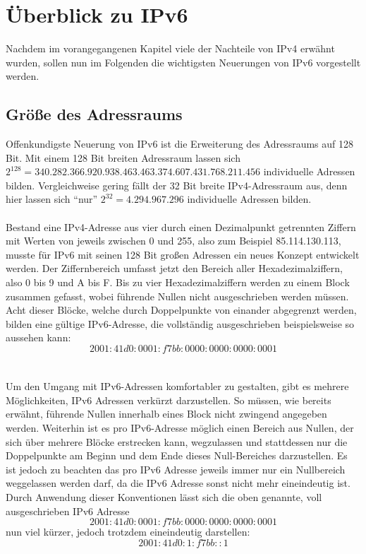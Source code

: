 \documentclass[a4paper,12pt]{scrartcl}
\begin{document}
\clearpage
\section{\"Uberblick zu IPv6}
Nachdem im vorangegangenen Kapitel viele der Nachteile von IPv4 erwähnt wurden, sollen nun im Folgenden die wichtigsten Neuerungen von IPv6 vorgestellt werden. 

\subsection{Gr\"o{\ss}e  des Adressraums}

Offenkundigste Neuerung von IPv6 ist die Erweiterung des Adressraums auf 128 Bit. Mit einem 128 Bit breiten Adressraum lassen sich \\
$2^{128} = 340.282.366.920.938.463.463.374.607.431.768.211.456$ individuelle Adressen bilden. Vergleichweise gering fällt der 32 Bit breite IPv4-Adressraum aus, denn hier lassen sich "`nur"' $2^{32} = 4.294.967.296$ individuelle Adressen bilden. \\
\\
Bestand eine IPv4-Adresse aus vier durch einen Dezimalpunkt getrennten Ziffern mit Werten von jeweils zwischen 0 und 255, also zum Beispiel 85.114.130.113, musste für IPv6 mit seinen 128 Bit großen Adressen ein neues Konzept entwickelt werden.
Der Ziffernbereich umfasst jetzt den Bereich aller Hexadezimalziffern, also 0 bis 9 und A bis F. Bis zu vier Hexadezimalziffern werden zu einem Block zusammen gefasst, wobei führende Nullen nicht ausgeschrieben werden m\"ussen. Acht dieser Blöcke, welche durch Doppelpunkte von einander abgegrenzt werden, bilden eine gültige IPv6-Adresse, die vollständig ausgeschrieben  beispielsweise so aussehen kann:  \[ 2001:41d0:0001:f7bb:0000:0000:0000:0001 \]\\
\\
Um den Umgang mit IPv6-Adressen komfortabler zu gestalten, gibt es mehrere Möglichkeiten, IPv6 Adressen verkürzt darzustellen. So müssen, wie bereits erwähnt, führende Nullen innerhalb eines Block nicht zwingend angegeben werden. Weiterhin ist es pro IPv6-Adresse möglich einen Bereich aus Nullen, der sich über mehrere Blöcke erstrecken kann, wegzulassen und stattdessen nur die Doppelpunkte am Beginn und dem Ende dieses Null-Bereiches darzustellen. Es ist jedoch zu beachten das pro IPv6 Adresse jeweils immer nur ein Nullbereich weggelassen werden darf, da die IPv6 Adresse sonst nicht mehr eineindeutig ist. Durch Anwendung dieser Konventionen lässt sich die oben genannte, voll ausgeschrieben IPv6 Adresse
\[ 2001:41d0:0001:f7bb:0000:0000:0000:0001 \]
nun viel kürzer, jedoch trotzdem eineindeutig darstellen:
 \[ 2001:41d0:1:f7bb::1 \]
 
\end{document}
